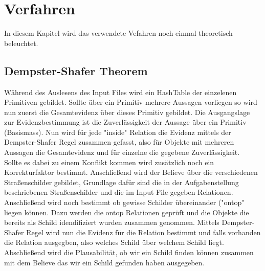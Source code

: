 \chapter{Verfahren}
In diesem Kapitel wird das verwendete Vefahren noch einmal
theoretisch beleuchtet.
\section{Dempster-Shafer Theorem}
  Während des Auslesens des Input Files wird ein HashTable
  der einzelenen Primitiven gebildet. Sollte über ein Primitiv 
  mehrere Aussagen vorliegen so wird nun zuerst die Gesamtevidenz
  über dieses Primitiv gebildet. Die Ausgangslage zur 
  Evidenzbestimmung ist die Zuverlässigkeit der Aussage über
  ein Primitiv (Basismass). Nun wird für jede "inside" 
  Relation die Evidenz mittels der Dempster-Shafer Regel
  zusammen gefasst, also für Objekte mit mehreren Aussagen 
  die Gesamtevidenz und für einzelne die gegebene 
  Zuverlässigkeit.\\
  Sollte es dabei zu einem Konflikt kommen
  wird zusätzlich noch ein Korrekturfaktor bestimmt. 
  Anschließend wird der Believe über die verschiedenen
  Straßenschilder gebildet, Grundlage dafür sind die in der
  Aufgabenstellung beschriebenen Straßenschilder und die im
  Input File gegeben Relationen. \\
  Anschließend wird noch bestimmt ob gewisse Schilder übereinander
  ("ontop" liegen können. Dazu werden die ontop Relationen
  geprüft und die Objekte die bereits als Schild idendifiziert wurden
  zusammen genommen. Mittels Dempster-Shafer Regel wird nun die Evidenz
  für die Relation bestimmt und falls vorhanden die Relation ausgegben,
  also welches Schild über welchem Schild liegt.
  Abschließend wird die Plausabilität, ob wir ein Schild
  finden können zusammen mit dem Believe das wir ein Schild
  gefunden haben ausgegeben.
